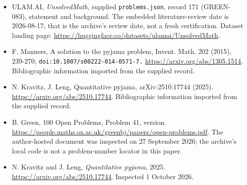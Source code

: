 \documentclass[11pt,a4paper]{article}
\begin{document}
{\small

\begin{itemize}

\item[\hypertarget{source:171:1}{S1}] ULAM.AI, \emph{UnsolvedMath}, supplied \texttt{problems.json}, record 171 (GREEN-083), statement and background. The embedded literature-review date is 2026-08-17; that is the archive’s review date, not a fresh certification. Dataset landing page: \url{https://huggingface.co/datasets/ulamai/UnsolvedMath}.

\item[\hypertarget{source:171:2}{S2}] F. Manners, A solution to the pyjama problem, Invent. Math. 202 (2015), 239-270, \nolinkurl{doi:10.1007/s00222-014-0571-7.} \url{https://arxiv.org/abs/1305.1514}. Bibliographic information imported from the supplied record.

\item[\hypertarget{source:171:3}{S3}] N. Kravitz, J. Leng, Quantitative pyjama, arXiv:2510.17744 (2025). \url{https://arxiv.org/abs/2510.17744}. Bibliographic information imported from the supplied record.

\item[\hypertarget{source:171:4}{S4}] B. Green, 100 Open Problems, Problem 41, version. \url{https://people.maths.ox.ac.uk/greenbj/papers/open-problems.pdf}. The author-hosted document was inspected on 27 September 2026; the archive’s local code is not a problem-number locator in this paper.

\item[E1] N. Kravitz and J. Leng, \emph{Quantitative pyjama}, 2025. \url{https://arxiv.org/abs/2510.17744}. Inspected 1 October 2026.

\end{itemize}

}

\label{end:171}
\end{document}
